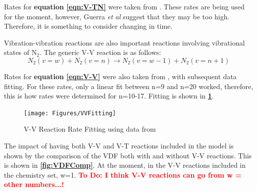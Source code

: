 \documentclass[11pt, oneside]{article}   	%
\newcommand{\todo}[1]{ \textcolor{red}{\bf{To Do:} #1}}
\begin{document}
Rates for \textbf{equation \ref{eqn:V-TN}} were taken from \cite{Guerra1995non}.
These rates are being used for the moment, however, Guerra \textit{et al} \cite{Guerra2004kinetic} suggest that they may be too high.
Therefore, it is something to consider changing in time.

Vibration-vibration reactions are also important reactions involving vibrational states of N$_2$.
The generic V-V reaction is as follows:
\begin{equation}
N_2(v=w) + N_2 (v=n) \rightarrow N_2(v=w-1) + N_2(v=n+1)
\label{eqn:V-V}
\end{equation}

Rates for \textbf{equation \ref{eqn:V-V}} were also taken from \cite{Billing1979vv}, with subsequent data fitting.
For these rates, only a linear fit between n=9 and n=20 worked, therefore, this is how rates were determined for n=10-17.
Fitting is shown in \textbf{\ref{fig:VVFit}}.

\begin{figure}
\begin{center}
\texttt{[image: Figures/VVFitting]}
\caption{V-V Reaction Rate Fitting using data from \cite{Billing1979vv}}
\label{fig:VVFit}
\end{center}
\end{figure}

The impact of having both V-V and V-T reactions included in the model is shown by the comparison of the VDF both with and without V-V reactions.
This is shown in \textbf{\ref{fig:VDFComp}}.
At the moment, in the V-V reactions included in the chemistry set, w=1.
\todo{I think V-V reactions can go from w = other numbers...!}
\end{document}
